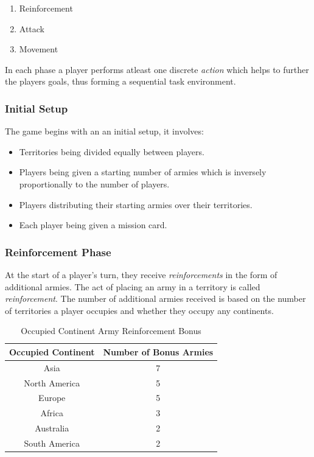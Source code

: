 \documentclass[parskip]{cs4rep}
\begin{document}
\begin{enumerate}
\item
Reinforcement
\item
Attack
\item
Movement
\newline
\end{enumerate}

In each phase a player performs atleast one discrete \textit{action} which helps to further the players goals, thus forming a sequential task environment.

\subsubsection{Initial Setup}

The game begins with an an initial setup, it involves:

\begin{itemize}
\item
Territories being divided equally between players.
\item
Players being given a starting number of armies which is inversely proportionally to the number of players.
\item
Players distributing their starting armies over their territories.
\item
Each player being given a mission card.
\end{itemize}

\subsubsection{Reinforcement Phase}

At the start of a player's turn, they receive \textit{reinforcements} in the form of additional armies. The act of placing an army in a territory is called \textit{reinforcement}.  The number of additional armies received is based on the number of territories a player occupies and whether they occupy any continents.
\newline

\begin{table}[ht]
\centering
\begin{tabular}{|c|c|}
\hline 
\textbf{Occupied Continent} & \textbf{Number of Bonus Armies} \\ 
\hline 
Asia & 7 \\ 
\hline 
North America & 5 \\ 
\hline 
Europe & 5 \\ 
\hline 
Africa & 3 \\
\hline
Australia & 2 \\
\hline  
South America & 2 \\
\hline 
\end{tabular}
\caption{Occupied Continent Army Reinforcement Bonus}
\label{table:continent_bonus}
\end{table}
\end{document}
